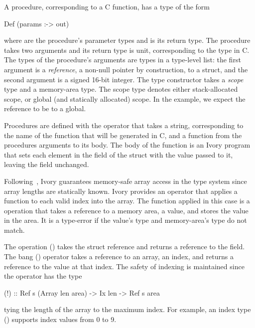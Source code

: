A procedure, corresponding to a C function, has a type of the form
\begin{code}
Def (params :-> out)
\end{code}
\noindent
where  are the procedure's parameter types and  is its return
type.  The procedure  takes two arguments and its return type is
unit, corresponding to the  type in C.  The types of the procedure's
arguments are types in a type-level list: the first argument is a
\emph{reference}, a non-null pointer by construction, to a struct, and the
second argument is a signed 16-bit integer.  The  type constructor takes
a \emph{scope} type and a memory-area type.  The scope type denotes either
stack-allocated scope, or global (and statically allocated) scope.  In the
example, we expect the reference to be to a global.


Procedures are defined with the  operator that takes a string,
corresponding to the name of the function that will be generated in C, and a
function from the procedures arguments to its body.  The body of the function is
an Ivory program that sets each element in the  field of the struct with
the value  passed to it, leaving the  field unchanged.

Following~\cite{memareas}, Ivory guarantees memory-safe array access in the type
system since array lengths are statically known.  Ivory provides an 
operator that applies a function to each valid index into the array.  The
function applied in this case is a  operation that takes a reference
to a memory area, a value, and stores the value in the area.  It is a type-error
if the value's type and memory-area's type do not match.

The operation () takes the struct reference and
returns a reference to the  field.  The bang (\cd{!}) operator takes a
reference to an array, an index, and returns a reference to the value at that
index.  The safety of indexing is maintained since the operator has the type
\begin{code}
(!) :: Ref s (Array len area) -> Ix len -> Ref s area
\end{code}
\noindent
tying the length of the array to the maximum index.  For example, an index type
() supports index values from 0 to 9.

